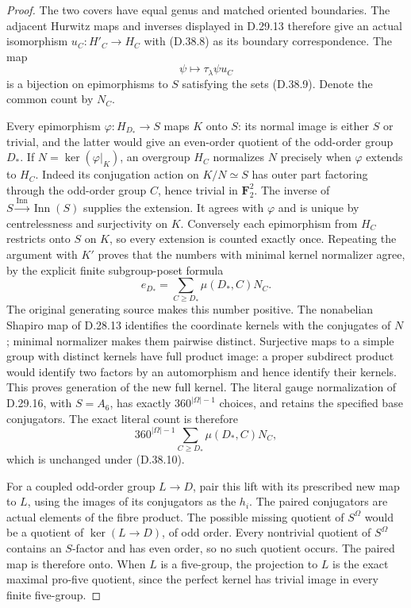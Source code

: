 \begin{proof}
The two covers have equal genus and matched oriented boundaries.
The adjacent Hurwitz maps and inverses displayed in D.29.13
therefore give an actual isomorphism \(u_C:H'_C\to H_C\)
with \textup{(D.38.8)} as its boundary correspondence.
The map
\[
                 \psi\longmapsto\tau_\lambda\psi u_C
 \tag{D.38.10}
\]
is a bijection on epimorphisms to \(S\) satisfying the sets
\textup{(D.38.9)}.  Denote the common count by \(N_C\).

Every epimorphism \(\varphi:H_{D_*}\to S\) maps \(K\)
onto \(S\): its normal image is either \(S\) or trivial,
and the latter would give an even-order quotient of the
odd-order group \(D_*\).  If
\(N=\ker(\varphi|_K)\), an overgroup \(H_C\) normalizes
\(N\) precisely when \(\varphi\) extends to \(H_C\).
Indeed its conjugation action on \(K/N\simeq S\) has outer
part factoring through the odd-order group \(C\), hence
trivial in \(\mathbf F_2^2\).
The inverse of \(S\xrightarrow{\operatorname{Inn}}
\operatorname{Inn}(S)\) supplies the extension.  It agrees
with \(\varphi\) and is unique by centrelessness and
surjectivity on \(K\).
Conversely each epimorphism from \(H_C\) restricts onto
\(S\) on \(K\), so every extension is counted exactly once.
Repeating the argument with \(K'\) proves that the numbers
with minimal kernel normalizer agree, by the explicit
finite subgroup-poset formula
\[
 e_{D_*}=\sum_{C\geq D_*}\mu(D_*,C)N_C.
 \tag{D.38.11}
\]
The original generating source makes this number positive.
The nonabelian Shapiro map of D.28.13 identifies the coordinate
kernels with the conjugates of \(N\); minimal normalizer makes
them pairwise distinct.  Surjective maps to a simple group
with distinct kernels have full product image: a proper
subdirect product would identify two factors by an
automorphism and hence identify their kernels.  This proves
generation of the new full kernel.
The literal gauge normalization of D.29.16, with \(S=A_6\),
has exactly \(360^{|\Omega|-1}\) choices, and retains the
specified base conjugators.  The exact literal count is
therefore
\[
       360^{|\Omega|-1}
           \sum_{C\geq D_*}\mu(D_*,C)N_C,
 \tag{D.38.12}
\]
which is unchanged under \textup{(D.38.10)}.

For a coupled odd-order group \(L\to D\), pair this lift
with its prescribed new map to \(L\), using the images of
its conjugators as the \(h_i\).  The paired conjugators
are actual elements of the fibre product.
The possible missing quotient of \(S^\Omega\) would be a
quotient of \(\ker(L\to D)\), of odd order.  Every nontrivial
quotient of \(S^\Omega\) contains an \(S\)-factor and has
even order, so no such quotient occurs.  The paired map
is therefore onto.  When \(L\) is a five-group, the
projection to \(L\) is the exact maximal pro-five quotient,
since the perfect kernel has trivial image in every
finite five-group.
\end{proof}

